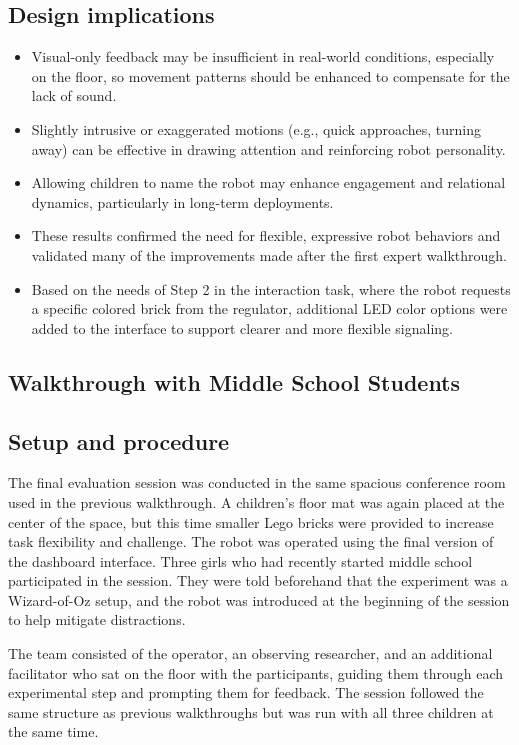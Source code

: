 \documentclass[a4paper]{usiinfbachelorproject}
\begin{document}
\subsection*{\textbf{Design implications}}
\begin{itemize}
    \item Visual-only feedback may be insufficient in real-world conditions, especially on the floor, so movement patterns should be enhanced to compensate for the lack of sound.
    \item Slightly intrusive or exaggerated motions (e.g., quick approaches, turning away) can be effective in drawing attention and reinforcing robot personality.
    \item Allowing children to name the robot may enhance engagement and relational dynamics, particularly in long-term deployments.
    \item These results confirmed the need for flexible, expressive robot behaviors and validated many of the improvements made after the first expert walkthrough.
    \item Based on the needs of Step 2 in the interaction task, where the robot requests a specific colored brick from the regulator, additional LED color options were added to the interface to support clearer and more flexible signaling.
\end{itemize}

\subsection{\textbf{Walkthrough with Middle School Students}}
\subsection*{\textbf{Setup and procedure}}
The final evaluation session was conducted in the same spacious conference room used in the previous walkthrough.
A children's floor mat was again placed at the center of the space, but this time smaller Lego bricks were provided to increase task flexibility and challenge.
The robot was operated using the final version of the dashboard interface.
Three girls who had recently started middle school participated in the session.
They were told beforehand that the experiment was a Wizard-of-Oz setup, and the robot was introduced at the beginning of the session to help mitigate distractions.

The team consisted of the operator, an observing researcher, and an additional facilitator who sat on the floor with the participants, guiding them through each experimental step and prompting them for feedback.
The session followed the same structure as previous walkthroughs but was run with all three children at the same time.
\end{document}

